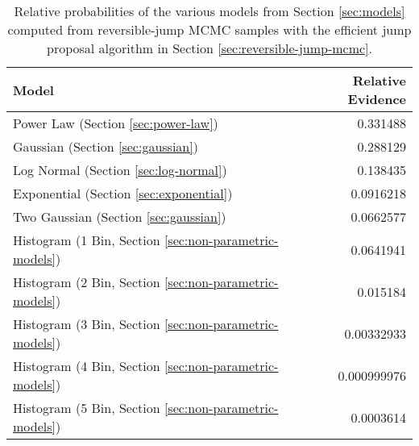 \documentclass[preprint]{aastex}
\begin{document}
\begin{table}
  \begin{center}
    \begin{tabular}{|l|r|}
      \hline
      Model & Relative Evidence \\
      \hline \hline
      Power Law (Section \ref{sec:power-law}) & 0.331488 \\
      \hline
      Gaussian (Section \ref{sec:gaussian}) & 0.288129 \\ 
      \hline
      Log Normal (Section \ref{sec:log-normal}) & 0.138435 \\
      \hline
      Exponential (Section \ref{sec:exponential}) & 0.0916218 \\
      \hline
      Two Gaussian (Section \ref{sec:gaussian}) & 0.0662577 \\
      \hline
      Histogram (1 Bin, Section \ref{sec:non-parametric-models}) &
      0.0641941 \\
      \hline
      Histogram (2 Bin, Section \ref{sec:non-parametric-models}) &
      0.015184 \\
      \hline 
      Histogram (3 Bin, Section \ref{sec:non-parametric-models}) &
      0.00332933 \\
      \hline
      Histogram (4 Bin, Section \ref{sec:non-parametric-models}) &
      0.000999976 \\
      \hline 
        Histogram (5 Bin, Section \ref{sec:non-parametric-models}) &
      0.0003614  \\
      \hline      
    \end{tabular}
  \end{center}
  \caption{\label{tab:rj} Relative probabilities of the various models
    from Section \ref{sec:models} computed from reversible-jump
    MCMC samples with the efficient jump proposal algorithm in Section \ref{sec:reversible-jump-mcmc}.}
\end{table}
\end{document}
